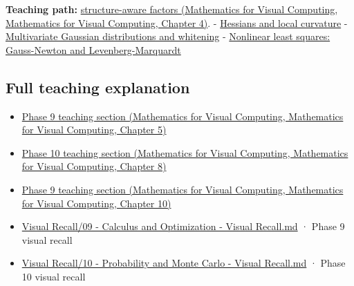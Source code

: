 \textbf{Teaching path:} \href{../02-Mathematics-for-Visual-Computing/main.pdf\#nameddest=01-foundations-i-ch020-structure-makes-a-decomposition-a-better-tool-than-generic-elimination}{structure-aware factors (Mathematics for Visual Computing, Mathematics for Visual Computing, Chapter 4)}. - \hyperref[appendix-6ac071f8b50c]{Hessians and local curvature} - \hyperref[appendix-12bbe185dbe5]{Multivariate Gaussian distributions and whitening} - \hyperref[appendix-2c2df8345991]{Nonlinear least squares: Gauss-Newton and Levenberg-Marquardt}

\subsection{Full teaching explanation}\label{appendix-50d2ea3c9b26-full-teaching-explanation}

\begin{itemize}
\tightlist
\item
  \href{../02-Mathematics-for-Visual-Computing/main.pdf\#nameddest=02-foundations-ii-ch021-jacobians-curvature-and-local-approximation}{Phase 9 teaching section (Mathematics for Visual Computing, Mathematics for Visual Computing, Chapter 5)}
\item
  \href{../02-Mathematics-for-Visual-Computing/main.pdf\#nameddest=02-foundations-ii-ch024-waiting-times-event-counts-and-covariance-geometry}{Phase 10 teaching section (Mathematics for Visual Computing, Mathematics for Visual Computing, Chapter 8)}
\item
  \href{../02-Mathematics-for-Visual-Computing/main.pdf\#nameddest=02-foundations-ii-ch026-optimization-and-inverse-problems}{Phase 9 teaching section (Mathematics for Visual Computing, Mathematics for Visual Computing, Chapter 10)}
\item
  \hyperref[appendix-adf48f5dc5c1]{Visual Recall/09 - Calculus and Optimization - Visual Recall.md} · Phase 9 visual recall
\item
  \hyperref[appendix-cb5af353ef77]{Visual Recall/10 - Probability and Monte Carlo - Visual Recall.md} · Phase 10 visual recall
\end{itemize}
